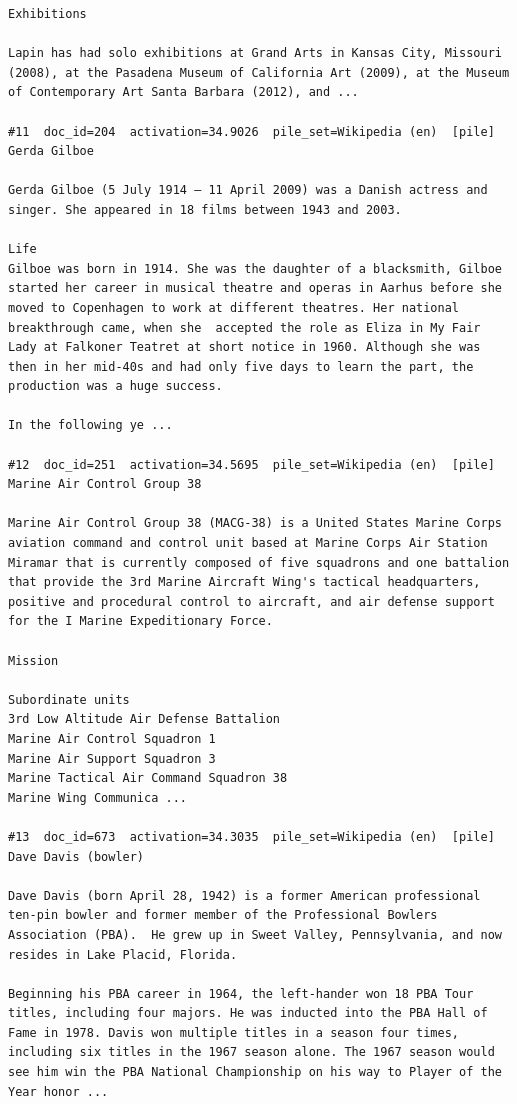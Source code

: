 \begin{verbatim}
Exhibitions 

Lapin has had solo exhibitions at Grand Arts in Kansas City, Missouri (2008), at the Pasadena Museum of California Art (2009), at the Museum of Contemporary Art Santa Barbara (2012), and ...

#11  doc_id=204  activation=34.9026  pile_set=Wikipedia (en)  [pile]
Gerda Gilboe

Gerda Gilboe (5 July 1914 – 11 April 2009) was a Danish actress and singer. She appeared in 18 films between 1943 and 2003.

Life 
Gilboe was born in 1914. She was the daughter of a blacksmith, Gilboe started her career in musical theatre and operas in Aarhus before she moved to Copenhagen to work at different theatres. Her national breakthrough came, when she  accepted the role as Eliza in My Fair Lady at Falkoner Teatret at short notice in 1960. Although she was then in her mid-40s and had only five days to learn the part, the production was a huge success.

In the following ye ...

#12  doc_id=251  activation=34.5695  pile_set=Wikipedia (en)  [pile]
Marine Air Control Group 38

Marine Air Control Group 38 (MACG-38) is a United States Marine Corps aviation command and control unit based at Marine Corps Air Station Miramar that is currently composed of five squadrons and one battalion that provide the 3rd Marine Aircraft Wing's tactical headquarters, positive and procedural control to aircraft, and air defense support for the I Marine Expeditionary Force.

Mission

Subordinate units
3rd Low Altitude Air Defense Battalion
Marine Air Control Squadron 1
Marine Air Support Squadron 3
Marine Tactical Air Command Squadron 38
Marine Wing Communica ...

#13  doc_id=673  activation=34.3035  pile_set=Wikipedia (en)  [pile]
Dave Davis (bowler)

Dave Davis (born April 28, 1942) is a former American professional ten-pin bowler and former member of the Professional Bowlers Association (PBA).  He grew up in Sweet Valley, Pennsylvania, and now resides in Lake Placid, Florida.

Beginning his PBA career in 1964, the left-hander won 18 PBA Tour titles, including four majors. He was inducted into the PBA Hall of Fame in 1978. Davis won multiple titles in a season four times, including six titles in the 1967 season alone. The 1967 season would see him win the PBA National Championship on his way to Player of the Year honor ...


\end{verbatim}
